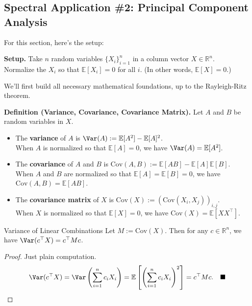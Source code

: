 \subsection{Spectral Application \#2: Principal Component Analysis}

For this section, here's the setup:
\begin{center}
    \textbf{Setup.} Take $n$ random variables $\{X_i\}_{i = 1}^n$ in a column vector $X \in \mathbb{R}^n$. \\
    Normalize the $X_i$ so that $\mathbb{E}[X_i] = 0$ for all $i$.  (In other words, $\mathbb{E}[X] = 0$.)
\end{center}
We'll first build all necessary mathematical foundations, up to the Rayleigh-Ritz theorem.

\textbf{Definition (Variance, Covariance, Covariance Matrix).} Let $A$ and $B$ be random variables in $X$.
\begin{itemize}
    \item The \textbf{variance} of $A$ is $\Var(A) := \mathbb{E}[A^2] - \mathbb{E}[A]^2$.  \\ When $A$ is normalized so that $\mathbb{E}[A] = 0$, we have $\Var(A) = \mathbb{E}[A^2]$.
    \item The \textbf{covariance} of $A$ and $B$ is $\mathrm{Cov}(A, B) := \mathbb{E}[AB] - \mathbb{E}[A]\mathbb{E}[B]$.  \\ When $A$ and $B$ are normalized so that $\mathbb{E}[A] = \mathbb{E}[B] = 0$, we have $\mathrm{Cov}(A, B) = \mathbb{E}[AB]$.
    \item The \textbf{covariance matrix} of $X$ is $\mathrm{Cov}(X) := (\mathrm{Cov}(X_i, X_j))_{i, j}$. \\
    When $X$ is normalized so that $\mathbb{E}[X] = 0$, we have $\mathrm{Cov}(X) = \mathbb{E}[XX^{\top}]$.
\end{itemize}

\begin{theorem}{Variance of Linear Combinations}
    Let $M := \mathrm{Cov}(X)$.  Then for any $c \in \mathbb{R}^n$, we have $\Var(c^{\top}X) = c^{\top}Mc$.
\end{theorem}

\begin{proof}
    Just plain computation. \vspace{-0.1cm}
    \[ \Var(c^{\top}X) = \Var\left(\sum_{i = 1}^n c_iX_i\right) = \mathbb{E}\left [ \left(\sum_{i = 1}^n c_i X_i \right)^2 \right ] = c^{\top}Mc. ~~~ \blacksquare \] \vspace{-0.5cm}
\end{proof}

